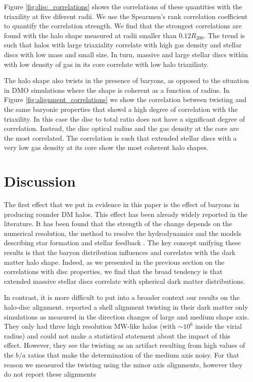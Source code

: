 \documentclass[usenatbib]{mnras}
\begin{document}
Figure \ref{fig:disc_correlations} shows the correlations of
these quantities with the triaxility at five diferent radii.
We use the Spearmen's rank correlation coefficient to quantify the
correlation strength.
We find that the strongest correlations are found with the halo shape
measured at radii smaller than $0.12R_{200}$.
The  trend is such that halos with large triaxiality correlate with
high gas density and stellar discs with low mass and small size. 
In turn, massive and large stellar discs within with low density of
gas in its core correlate with low halo triaxiliaty. 

The halo shape also twists in the presence of baryons, as opposed to
the situation in DMO simulations where the shape is coherent as a
function of radius.
In Figure \ref{fig:alignment_correlations} we show the correlation
between twisting and the same baryonic properties that showd a high
degree of correlation with the triaxility.
In this case the disc to total ratio does not have a significant
degree of correlation.
Instead, the disc optical radius and the gas density at the core are
the most correlated. 
The correlation is such that extended stellar discs with a very low
gas density at its core show the most coherent halo shapes.  

\section{Discussion}
\label{sec:discussion}


The first effect that we put in evidence in this paper is the effect
of baryons in producing rounder DM halos.
This effect has been already widely reported in the literature.
It has been found that the strength of the change depends on the
numerical resolution, the method to resolve the hydrodynamics and the
models describing star formation and stellar feedback
\citep{Bailin05,Debattista08, Bryan13, Butsky16, Chua19, Artale19}.  
The key concept unifying these results is that the baryon distribution
influences and correlates with the dark matter halo shape. 
Indeed, as we presented in the previous section on the correlations
with disc properties, we find that the broad tendency is that extended
massive stellar discs correlate with spherical dark matter
distributions.  

In contrast, it is more difficult to put into a broader context our
results on the halo-disc alignment.
\cite{JingSuto02} reported a shell alignment twisting in their dark
matter only simulations as measured in the direction changes of large
and medium shape axis. 
They only had three high resolution MW-like halos (with
$\sim 10^{6}$ inside the virial radius) and could not make a
statistical statement about the impact of this effect.
However, they see the twisting as an artifact resulting from high values of the
$b/a$ ratios that make the determination of the medium axis noisy.
For that reason we measured the twisting using the minor axis
alignments, however they do not report these alignments
\end{document}
